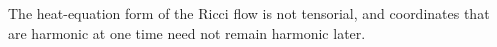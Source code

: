 \begin{remark}
\label{ch03-rem-harmonic-coordinate-caution}
The heat-equation form of the Ricci flow is not tensorial, and coordinates that are harmonic at one time need not remain harmonic later.
\end{remark}
